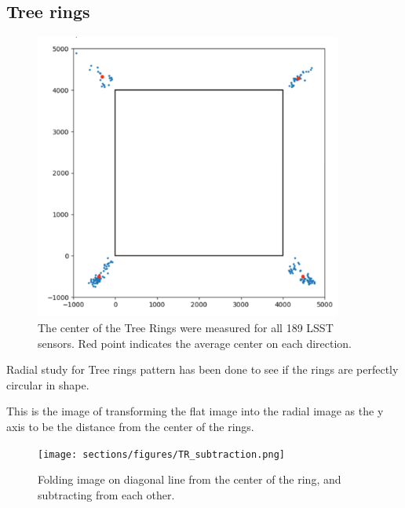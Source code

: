 \subsection{Tree rings}\label{tree-rings}

\begin{figure}
\begin{centering}
\includegraphics[width=0.9\textwidth]{sections/figures/TR_centers.png}
\end{centering}
\caption{The center of the Tree Rings were measured for all 189 LSST sensors. Red point indicates the average center on each direction.}
\end{figure}

Radial study for Tree rings pattern has been done to see if the rings are perfectly circular in shape. 

This is the image of transforming the flat image into the radial image as the y axis to be the distance from the center of the rings. 

\begin{figure}
\begin{centering}
\texttt{[image: sections/figures/TR\_subtraction.png]}
\end{centering}
\caption{Folding image on diagonal line from the center of the ring, and subtracting from each other.}
\end{figure}

